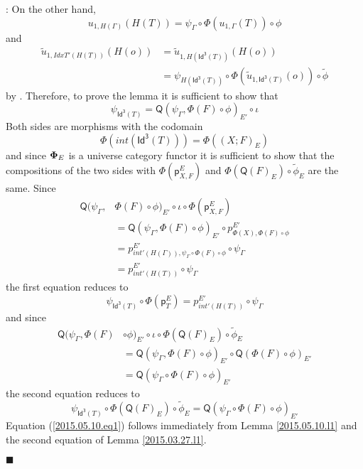 \documentclass[12pt]{article}
\numberwithin{equation}{section}
\newenvironment{eq}{\begin{equation}}{\end{equation}}
\newenvironment{myproof}{{\bf Proof}:}{$\blacksquare$ \vskip 5mm }
\newcommand{\llabel}[1]{\label{#1}}
\newcommand{\wt}{\widetilde}
\newcommand{\p}{\mathsf{p}}
\newcommand{\Idx}{\mathsf{Id^3}} %
\newcommand{\Q}{\mathsf{Q}}
\begin{document}
\begin{myproof}
On the other hand,
%
$$u_{1,H(\Gamma)}(H(T))=\psi_{\Gamma}\circ \Phi(u_{1,\Gamma}(T))\circ \phi$$
and
\begin{align*}
  \wt{u}_{1,IdxT'(H(T))}(H(o))
    & = \wt{u}_{1,H(\Idx(T))}(H(o)) \\
    & = \psi_{H(\Idx(T))}\circ \Phi(\wt{u}_{1,\Idx(T)}(o))\circ \wt{\phi}
\end{align*}
%
by \cite[Lemma 6.1(1,2)]{fromunivwithPi}. Therefore, to prove the lemma it is
sufficient to show that
%
$$\psi_{\Idx(T)}=\Q(\psi_{\Gamma},\Phi(F)\circ\phi)_{E'}\circ\iota$$
%
Both sides are morphisms with the codomain
%
$$\Phi(int(\Idx(T)))=\Phi((X;F)_E)$$
%
and since ${\bf\Phi}_E$ is a universe category functor it is sufficient to show
that the compositions of the two sides with $\Phi(\p^E_{X,F})$ and
$\Phi(\Q(F)_E)\circ \wt{\phi}_E$ are the same. Since
%
\begin{align*}
  \Q(\psi_{\Gamma},&\Phi(F)\circ\phi)_{E'}\circ\iota\circ \Phi(\p^E_{X,F}) \\
    & = \Q(\psi_{\Gamma},\Phi(F)\circ\phi)_{E'}\circ p^{E'}_{\Phi(X),\Phi(F)\circ\phi} \\
    & = p^{E'}_{int'(H(\Gamma)),\psi_{\Gamma}\circ \Phi(F)\circ\phi}\circ\psi_{\Gamma} \\
    & = p^{E'}_{int'(H(T))}\circ\psi_{\Gamma}
\end{align*}
%
the first equation reduces to
%
\begin{eq}
\llabel{2015.05.10.eq1} \psi_{\Idx(T)}\circ
\Phi(\p^E_{T})=p^{E'}_{int'(H(T))}\circ\psi_{\Gamma}
\end{eq}%
%
and since
%
\begin{align*}
  \Q(\psi_{\Gamma},\Phi(F)&\circ\phi)_{E'}\circ\iota\circ \Phi(\Q(F)_E)\circ \wt{\phi}_E \\
    & = \Q(\psi_{\Gamma},\Phi(F)\circ\phi)_{E'}\circ \Q(\Phi(F)\circ\phi)_{E'} \\
    & = \Q(\psi_{\Gamma}\circ \Phi(F)\circ \phi)_{E'}
\end{align*}
%
the second equation reduces to
%
\begin{eq}
\llabel{2015.05.10.eq2.0} \psi_{\Idx(T)}\circ \Phi(\Q(F)_E)\circ
\wt{\phi}_E=\Q(\psi_{\Gamma}\circ \Phi(F)\circ \phi)_{E'}
\end{eq}%
%
Equation (\ref{2015.05.10.eq1}) follows immediately from Lemma
\ref{2015.05.10.l1} and the second equation of Lemma \ref{2015.03.27.l1}.


\end{myproof}
\end{document}
